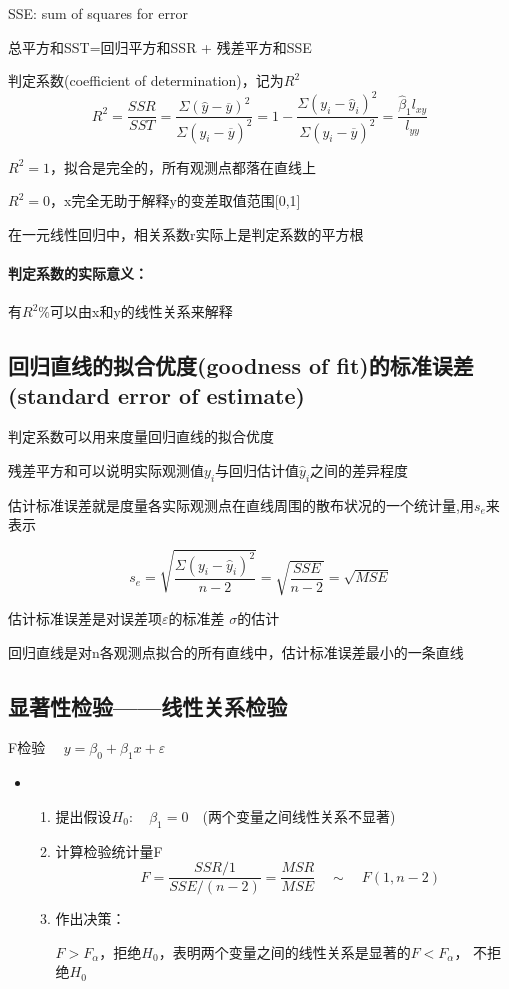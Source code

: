 \documentclass[UTF8,10pt]{book}
\begin{document}
SSE: sum of squares for error 

总平方和SST=回归平方和SSR + 残差平方和SSE 

判定系数(coefficient of determination)，记为$R^2$ 
$$R^2 = \frac{SSR}{SST}=\frac{\Sigma(\hat{y}-\overline{y})^2}{\Sigma(y_i-\overline{y})^2} = 1 - \frac{\Sigma(y_i - \hat{y}_i)^2}{\Sigma(y_i-\overline{y})^2} = \frac{\hat{\beta}_1 l_{x y }}{l_{y y}} $$ 

$R^2=1$，拟合是完全的，所有观测点都落在直线上

$R^2=0$，x完全无助于解释y的变差取值范围[0,1] 

在一元线性回归中，相关系数r实际上是判定系数的平方根 

\paragraph{判定系数的实际意义：}有$R^2\%$可以由x和y的线性关系来解释

\subsection{回归直线的拟合优度(goodness of fit)的标准误差(standard error of estimate)}	

判定系数可以用来度量回归直线的拟合优度 

残差平方和可以说明实际观测值$y_i$与回归估计值$\hat{y}_i$之间的差异程度 

估计标准误差就是度量各实际观测点在直线周围的散布状况的一个统计量,用$s_e$来表示 

$$ s_e = \sqrt{\frac{\Sigma (y_i - \hat{y}_i)^2}{n-2}} = \sqrt{\frac{SSE}{n-2}}=\sqrt{MSE} $$ 

估计标准误差是对误差项$\varepsilon$的标准差 $\sigma$的估计 

回归直线是对n各观测点拟合的所有直线中，估计标准误差最小的一条直线

\subsection{显著性检验——线性关系检验}	
F检验
$\quad y = \beta_0 + \beta_1 x+ \varepsilon \quad $


\begin{itemize}
	\item [] {
		\begin{enumerate}
			\item 提出假设$H_0 :\quad \beta_1 = 0 \quad$(两个变量之间线性关系不显著)
			\item 计算检验统计量F $$\quad F = \frac{SSR/1}{SSE/(n-2)} =\frac{MSR}{MSE} \quad \sim \quad F(1,n-2) $$		
			\item 作出决策：
			
			$F>F_{\alpha}$，拒绝$H_0$，表明两个变量之间的线性关系是显著的$F<F_{\alpha}$，
			不拒绝$H_0$ 
			
		\end{enumerate}
	}
\end{itemize}
\end{document}
